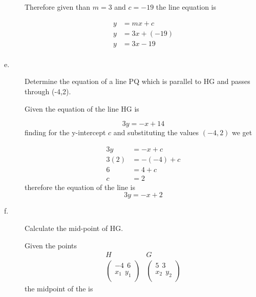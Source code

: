 \documentclass{article}
\begin{document}
\begin{description}
        Therefore given than $m=3$ and $c=-19$ the line equation is

        $$
            \begin{aligned}
                y & = mx + c     \\
                y & = 3x + (-19) \\
                y & = 3x -19     \\
            \end{aligned}
        $$

    \item[e.] \begin{large}Determine the equation of a line PQ which is parallel to HG and passes through (-4,2).\end{large}

        Given the equation of the line HG is

        $$
            3y = -x + 14
        $$
        finding for the y-intercept $c$ and substituting the values $(-4, 2)$ we get

        $$
            \begin{aligned}
                3y   & = -x + c    \\
                3(2) & = -(-4) + c \\
                6    & = 4 + c     \\
                c    & = 2
            \end{aligned}
        $$
        therefore the equation of the line is
        $$
            3y = -x + 2
        $$

    \item[f.] \begin{large}Calculate the mid-point of HG.\end{large}

        Given the points
        $$
            \begin{array}{c}
                H \\
                \begin{pmatrix}
                    -4 \ \ 6    \\
                    x_1 \ \ y_1 \\
                \end{pmatrix}
            \end{array}
            \begin{array}{c}
                G \\
                \begin{pmatrix}
                    5 \ \ 3     \\
                    x_2 \ \ y_2 \\
                \end{pmatrix}
            \end{array}
        $$
        the midpoint of the is


\end{description}
\end{document}
